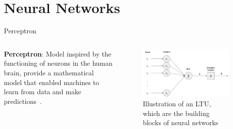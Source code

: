 \section{Neural Networks}\label{sec:neural-networks}

\begin{frame}{Perceptron}
    \begin{columns}
        \column{\moit} \textbf{Perceptron}: Model inspired by the functioning of neurons in the human brain, provide a mathematical model that enabled machines to learn from data and make predictions~\cite{rosenblatt1958perceptron}.
        \column{\moit} \begin{figure}[ht]
                                \centering
                                \includegraphics[width=\textwidth]{imgs/Single-Perceptron.png}
                                \caption{Illustration of an LTU, which are the building blocks of neural networks}
                                \label{fig:perceptron}
                            \end{figure}
    \end{columns}
\end{frame}


